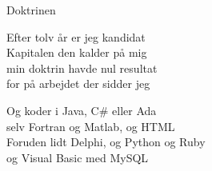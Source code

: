 \begin{song}{Doktrinen}
  \begin{SBVerse}
    Efter tolv år er jeg kandidat\\
    Kapitalen den kalder på mig\\
    min doktrin havde nul resultat\\
    for på arbejdet der sidder jeg
  \end{SBVerse}

  \begin{SBChorus}
    Og koder i Java, C\# eller Ada\\
    selv Fortran og Matlab, og HTML\\
    Foruden lidt Delphi, og Python og Ruby\\
    og Visual Basic med MySQL
  \end{SBChorus}
\end{song}